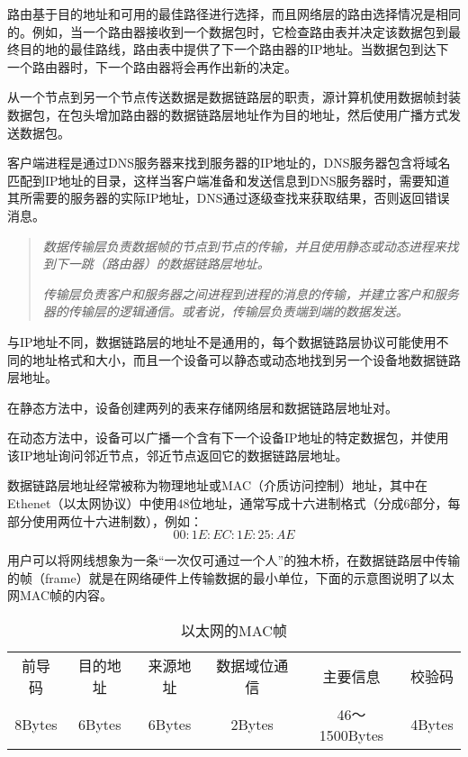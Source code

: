 路由基于目的地址和可用的最佳路径进行选择，而且网络层的路由选择情况是相同的。例如，当一个路由器接收到一个数据包时，它检查路由表并决定该数据包到最终目的地的最佳路线，路由表中提供了下一个路由器的IP地址。当数据包到达下一个路由器时，下一个路由器将会再作出新的决定。

从一个节点到另一个节点传送数据是数据链路层的职责，源计算机使用数据帧封装数据包，在包头增加路由器的数据链路层地址作为目的地址，然后使用广播方式发送数据包。

客户端进程是通过DNS服务器来找到服务器的IP地址的，DNS服务器包含将域名匹配到IP地址的目录，这样当客户端准备和发送信息到DNS服务器时，需要知道其所需要的服务器的实际IP地址，DNS通过逐级查找来获取结果，否则返回错误消息。

\begin{quote}
\textsl{数据传输层负责数据帧的节点到节点的传输，并且使用静态或动态进程来找到下一跳（路由器）的数据链路层地址。}

\textsl{传输层负责客户和服务器之间进程到进程的消息的传输，并建立客户和服务器的传输层的逻辑通信。或者说，传输层负责端到端的数据发送。}
\end{quote}


与IP地址不同，数据链路层的地址不是通用的，每个数据链路层协议可能使用不同的地址格式和大小，而且一个设备可以静态或动态地找到另一个设备地数据链路层地址。

\begin{compactitem}
\item 在静态方法中，设备创建两列的表来存储网络层和数据链路层地址对。
\item 在动态方法中，设备可以广播一个含有下一个设备IP地址的特定数据包，并使用该IP地址询问邻近节点，邻近节点返回它的数据链路层地址。
\end{compactitem}

数据链路层地址经常被称为物理地址或MAC（介质访问控制）地址，其中在Ethenet（以太网协议）中使用48位地址，通常写成十六进制格式（分成6部分，每部分使用两位十六进制数），例如：
\[00:1E:EC:1E:25:AE\]

用户可以将网线想象为一条“一次仅可通过一个人”的独木桥，在数据链路层中传输的帧（frame）就是在网络硬件上传输数据的最小单位，下面的示意图说明了以太网MAC帧的内容。

\begin{table}[htbp]
\centering
\caption{以太网的MAC帧}

\begin{tabular}{|c|c|c|c|c|c|}
\hline
前导码 & 目的地址 & 来源地址 & 数据域位通信 & 主要信息 & 校验码 \\
8Bytes & 6Bytes & 6Bytes & 2Bytes & 46～1500Bytes & 4Bytes\\
\hline
\end{tabular}
\end{table}

